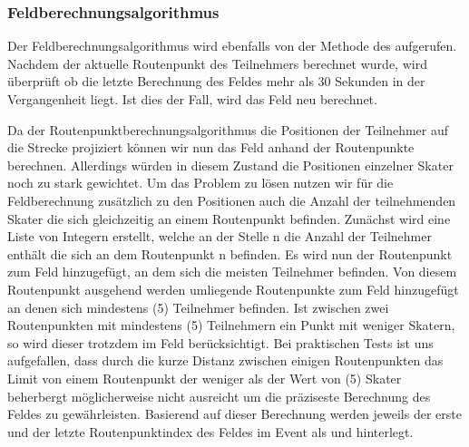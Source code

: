 \subsubsection{Feldberechnungsalgorithmus}
Der Feldberechnungsalgorithmus wird ebenfalls von der  Methode des  aufgerufen. Nachdem der aktuelle Routenpunkt des Teilnehmers berechnet wurde, wird überprüft ob die letzte Berechnung des Feldes mehr als 30 Sekunden in der Vergangenheit liegt. Ist dies der Fall, wird das Feld neu berechnet.

Da der Routenpunktberechnungsalgorithmus die Positionen der Teilnehmer auf die Strecke projiziert können wir nun das Feld anhand der Routenpunkte berechnen. Allerdings würden in diesem Zustand die Positionen einzelner Skater noch zu stark gewichtet. Um das Problem zu lösen nutzen wir für die Feldberechnung zusätzlich zu den Positionen auch die Anzahl der teilnehmenden Skater die sich gleichzeitig an einem Routenpunkt befinden.
Zunächst wird eine Liste von Integern erstellt, welche an der Stelle n die Anzahl der Teilnehmer enthält die sich an dem Routenpunkt n befinden. Es wird nun der Routenpunkt zum Feld hinzugefügt, an dem sich die meisten Teilnehmer befinden. Von diesem Routenpunkt ausgehend werden umliegende Routenpunkte zum Feld hinzugefügt an denen sich mindestens  (5) Teilnehmer befinden. Ist zwischen zwei Routenpunkten mit mindestens  (5) Teilnehmern ein Punkt mit weniger Skatern, so wird dieser trotzdem im Feld berücksichtigt. Bei praktischen Tests ist uns aufgefallen, dass durch die kurze Distanz zwischen einigen Routenpunkten das Limit von einem Routenpunkt der weniger als der Wert von  (5) Skater beherbergt möglicherweise nicht ausreicht um die präziseste Berechnung des Feldes zu gewährleisten. Basierend auf dieser Berechnung werden jeweils der erste und der letzte Routenpunktindex des Feldes im Event als  und  hinterlegt.